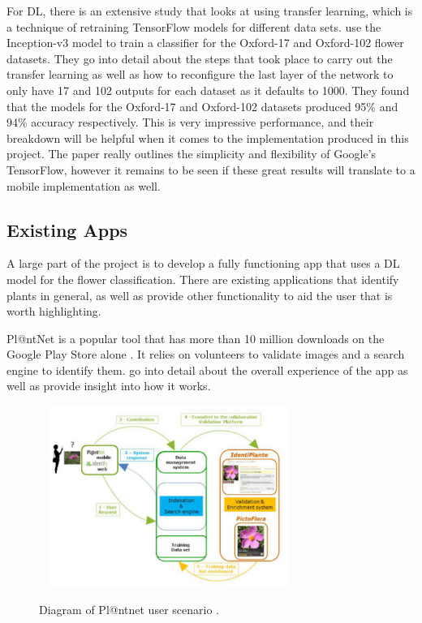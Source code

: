 \documentclass[12pt,a4paper]{report}
\begin{document}
For DL, there is an extensive study that looks at using transfer learning, which is a technique of retraining
TensorFlow models for different data sets. \citet{Xia2017} use the Inception-v3 model to train a classifier for 
the Oxford-17 and Oxford-102 flower datasets. They go into detail about the steps that took place to carry out the 
transfer learning as well as how to reconfigure the last layer of the network to only have 17 and 102 outputs for each 
dataset as it defaults to 1000. They found that the models for the Oxford-17 and Oxford-102 datasets 
produced 95\% and 94\% accuracy respectively. This is very impressive performance, and their breakdown will be helpful 
when it comes to the implementation produced in this project. 
The paper really outlines the simplicity and flexibility of Google's 
TensorFlow, however it remains to be seen if these great results will translate to a mobile implementation 
as well.

\subsection{Existing Apps}

A large part of the project is to develop a fully functioning app that uses a
DL model for the flower classification. There are existing applications that identify plants in general, as well as
provide other functionality to aid the user that is worth highlighting.

\par

Pl@ntNet is a popular tool that has more than 10 million downloads on the Google Play Store alone \citep{googleplay}. 
It relies on volunteers to validate images and a search engine to identify them. \citet{joly:hal-01182775}
go into detail about the overall experience of the app as well as provide insight into how it works.

\begin{figure}[h]\
    \centering
    \includegraphics[width=0.7\textwidth]{plantnet.png}
    \caption{Diagram of Pl@ntnet user scenario \citep{joly:hal-01182775}.}
    \label{fig:plantnet}
\end{figure}
\end{document}
